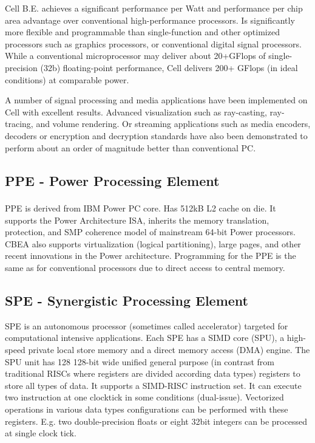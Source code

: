 Cell B.E. achieves a significant performance per Watt and performance per chip area advantage over conventional high-performance processors.
Is significantly more flexible and programmable than single-function and other optimized processors such as graphics processors, or conventional digital signal processors.
While a conventional microprocessor may deliver about 20+GFlops of single-precision (32b) floating-point performance, Cell delivers 200+ GFlops (in ideal conditions) at comparable power.

A number of signal processing and media applications have been implemented on Cell with excellent results.
Advanced visualization such as ray-casting, ray-tracing, and volume rendering.
Or streaming applications such as media encoders, decoders or encryption and decryption standards have also been demonstrated to perform about an order of magnitude better than conventional PC.


\subsection{PPE - Power Processing Element}
PPE is derived from IBM Power PC\textsuperscript{\textregistered} core. Has 512kB L2 cache on die.
It supports the Power Architecture ISA, inherits the memory translation, protection, and SMP coherence model of mainstream 64-bit Power processors.
CBEA also supports virtualization (logical partitioning), large pages, and other recent innovations in the Power architecture.
Programming for the PPE is the same as for conventional processors due to direct access to central memory.

\subsection{SPE - Synergistic Processing Element}

\par
SPE is an autonomous processor (sometimes called accelerator) targeted for computational intensive applications.
Each SPE has a SIMD core (SPU), a high-speed private local store memory and a direct memory access (DMA) engine.
The SPU unit has 128 128-bit wide unified general purpose (in contrast from traditional RISCs where registers are divided according data types) registers to store all types of data.
It supports a SIMD-RISC instruction set.
It can execute two instruction at one clocktick in some conditions (dual-issue).
Vectorized operations in various data types configurations can be performed with these registers.
E.g. two double-precision floats or eight 32bit integers can be processed at single clock tick.

